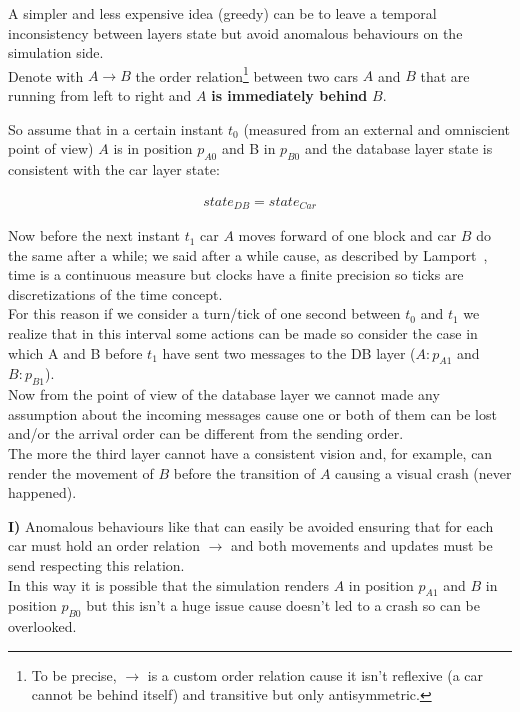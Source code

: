 A simpler and less expensive idea (greedy) can be to leave a temporal inconsistency between 
layers state but avoid anomalous behaviours on the simulation side. \\

\noindent
Denote with $A \rightarrow B$ the order relation\footnote{
    To be precise, $\rightarrow$ is a custom order relation cause it isn't 
    reflexive (a car cannot be behind itself) and transitive but only antisymmetric.
} between two cars $A$ and $B$ that are running from left to right and $A$ 
\textbf{is immediately behind} $B$. 

So assume that in a certain instant $t_0$ 
(measured from an external and omniscient point of view) 
$A$ is in position $p_{A0}$ and B in $p_{B0}$ and 
the database layer state is consistent with the car layer state:

\begin{equation}\begin{split}
    state_{DB} = state_{Car}
\end{split}\end{equation} 

\noindent
Now before the next instant $t_1$ car $A$ moves forward of one block and car $B$
do the same after a while; we said after a while cause, as described by Lamport~\cite{Lamport:1978},
time is a continuous measure but clocks have a finite precision so 
ticks are discretizations of the time concept.\\
\indent
For this reason if we consider a turn/tick 
of one second between $t_0$ and $t_1$ we realize that in this interval some 
actions can be made so consider the case in which A and B before $t_1$ 
have sent two messages to the DB layer ($A:p_{A1}$ and $B:p_{B1}$).\\
\indent
Now from the point of view of the database layer we cannot made any assumption 
about the incoming messages cause one or both of them can be lost and/or the 
arrival order can be different from the sending order. \\
\indent
The more the third layer cannot have a consistent vision and, for example, 
can render the movement of $B$ before the transition of $A$ causing 
a visual crash (never happened).\\

\begin{tcolorbox}
\textbf{I)} Anomalous behaviours like that can easily be avoided ensuring that 
for each car must hold an order relation $\rightarrow$ and both movements 
and updates must be send respecting this relation.\\

In this way it is possible 
that the simulation renders $A$ in position $p_{A1}$ and $B$ in position 
$p_{B0}$ but this isn't a huge issue cause doesn't led to a crash so 
can be overlooked.
\end{tcolorbox}


